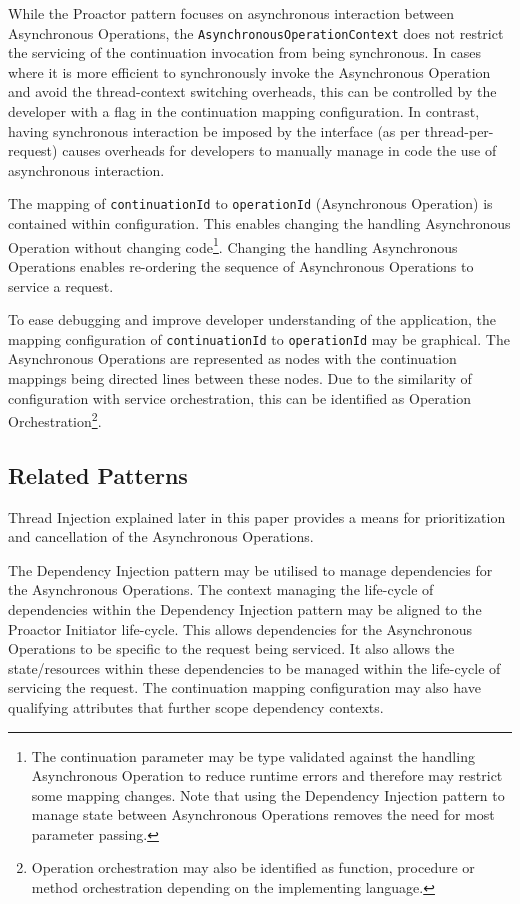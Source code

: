 \documentclass[prodmode]{style/acmlarge}
\begin{document}
While the Proactor pattern focuses on asynchronous interaction between
Asynchronous Operations, the \texttt{AsynchronousOperationContext} does not
restrict the servicing of the continuation invocation from being synchronous.
In cases where it is more efficient to synchronously invoke the Asynchronous
Operation and avoid the thread-context switching overheads, this can be
controlled by the developer with a flag in the continuation mapping
configuration.  In contrast, having synchronous interaction be imposed by the
interface (as per thread-per-request) causes overheads for developers to
manually manage in code the use of asynchronous interaction.

The mapping of \texttt{continuationId} to \texttt{operationId} (Asynchronous
Operation) is contained within configuration.  This enables changing the
handling Asynchronous Operation without changing code\footnote{The continuation
parameter may be type validated against the handling Asynchronous Operation to
reduce runtime errors and therefore may restrict some mapping changes.  Note
that using the Dependency Injection pattern to manage state between Asynchronous
Operations removes the need for most parameter passing.}.  Changing the handling
Asynchronous Operations enables re-ordering the sequence of Asynchronous
Operations to service a request.

To ease debugging and improve developer understanding of the application, the
mapping configuration of \texttt{continuationId}  to \texttt{operationId} may be
graphical.  The Asynchronous Operations are represented as nodes with the
continuation mappings being directed lines between these nodes.  Due to the
similarity of configuration with service orchestration, this can be identified
as Operation Orchestration\footnote{Operation orchestration may also be
identified as function, procedure or method orchestration depending on the
implementing language.}.


\subsection{Related Patterns}

Thread Injection explained later in this paper provides a means for
prioritization and cancellation of the Asynchronous Operations.

The Dependency Injection pattern \cite{ioc} may be utilised to manage
dependencies for the Asynchronous Operations.  The context managing the
life-cycle of dependencies within the Dependency Injection pattern may be
aligned to the Proactor Initiator life-cycle.  This allows dependencies for the
Asynchronous Operations to be specific to the request being serviced.  It also
allows the state/resources within these dependencies to be managed within the
life-cycle of servicing the request.  The continuation mapping configuration may
also have qualifying attributes that further scope dependency contexts.
\end{document}

